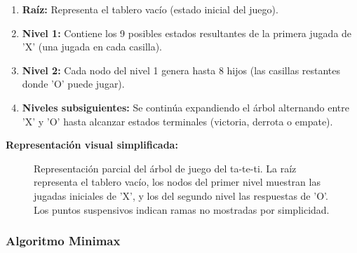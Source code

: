\documentclass[12pt]{article}
\begin{document}
\begin{enumerate}[leftmargin=2em]
    \item \textbf{Raíz:} Representa el tablero vacío (estado inicial del juego).
    \item \textbf{Nivel 1:} Contiene los 9 posibles estados resultantes de la primera jugada de 'X' (una jugada en cada casilla).
    \item \textbf{Nivel 2:} Cada nodo del nivel 1 genera hasta 8 hijos (las casillas restantes donde 'O' puede jugar).
    \item \textbf{Niveles subsiguientes:} Se continúa expandiendo el árbol alternando entre 'X' y 'O' hasta alcanzar estados terminales (victoria, derrota o empate).
\end{enumerate}

\textbf{Representación visual simplificada:}

\begin{figure}[H]
\centering
{}
\caption{Representación parcial del árbol de juego del ta-te-ti. La raíz representa el tablero vacío, los nodos del primer nivel muestran las jugadas iniciales de 'X', y los del segundo nivel las respuestas de 'O'. Los puntos suspensivos indican ramas no mostradas por simplicidad.}
\label{fig:arbol-tateti}
\end{figure}

\subsubsection*{Algoritmo Minimax}
\end{document}
